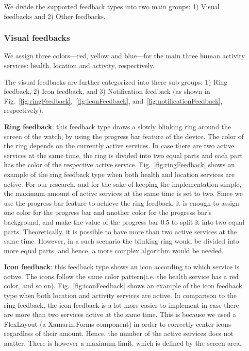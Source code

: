 \documentclass[conference, a4paper, 10pt, twocolumn]{IEEEtran}
\begin{document}
We divide the supported feedback types into two main groups: 1) Visual feedbacks and 2) Other feedbacks.

\subsubsection{Visual feedbacks}
We assign three colors---red, yellow and blue---for the main three human activity services: health, location and activity, respectively.

The visual feedbacks are further categorized into there sub groups: 1) Ring feedback, 2) Icon feedback, and 3) Notification feedback (as shown in Fig.~\ref{fig:ringFeedback},~\ref{fig:iconFeedback}, and~\ref{fig:notificationFeedback}, respectively).

\textbf{Ring feedback}: this feedback type draws a slowly blinking ring around the screen of the watch, by using the progress bar feature of the device. The color of the ring depends on the currently active services. In case there are two active services at the same time, the ring is divided into two equal parts and each part has the color of the respective active service. Fig.~\ref{fig:ringFeedback} shows an example of the ring feedback type when both health and location services are active. For our research, and for the sake of keeping the implementation simple, the maximum amount of active services at the same time is set to two. Since we use the progress bar feature to achieve the ring feedback, it is enough to assign one color for the progress bar and another color for the progress bar's background, and make the value of the progress bar 0.5 to split it into two equal parts. Theoretically, it is possible to have more than two active services at the same time. However, in a such scenario the blinking ring would be divided into more equal parts, and hence, a more complex algorithm would be needed. 

\textbf{Icon feedback}: this feedback type shows an icon according to which service is active. The icons follow the same color pattern(i.e. the health service has a red color, and so on). Fig.~\ref{fig:iconFeedback} shows an example of the icon feedback type when both location and activity services are active. In comparison to the ring feedback, the icon feedback is a lot more easier to implement in case there are more than two services active at the same time. This is because we used a FlexLayout (a Xamarin.Forms component) in order to correctly center icons regardless of their amount. Hence, the number of the active services does not matter. There is however a maximum limit, which is defined by the screen area.
\end{document}
